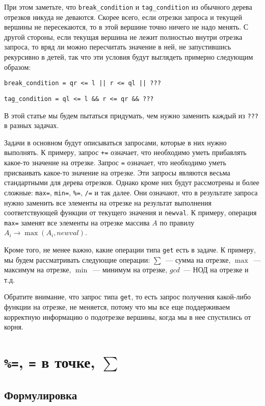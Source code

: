 При этом заметьте, что \verb+break_condition+ и \verb+tag_condition+ из обычного дерева отрезков никуда не деваются. Скорее всего, если отрезки запроса и текущей вершины не пересекаются, то в этой вершине точно ничего не надо менять. С другой стороны, если текущая вершина не лежит полностью внутри отрезка запроса, то вряд ли можно пересчитать значение в ней, не запустившись рекурсивно в детей, так что эти условия будут выглядеть примерно следующим образом:

\verb+break_condition = qr <= l || r <= ql || ???+

\verb+tag_condition = ql <= l && r <= qr && ???+

В этой статье мы будем пытаться придумать, чем нужно заменить каждый из \verb+???+ в разных задачах.

Задачи в основном будут описываться запросами, которые в них нужно выполнять. К примеру, запрос \verb^+=^ означает, что необходимо уметь прибавлять какое-то значение на отрезке. Запрос \verb+=+ означает, что необходимо уметь присваивать какое-то значение на отрезке. Эти запросы являются весьма стандартными для дерева отрезков. Однако кроме них будут рассмотрены и более сложные: \verb+max=+, \verb+min=+, \verb+%=+, \verb+/=+ и так далее. Они означают, что в результате запроса нужно заменить все элементы на отрезке на результат выполнения соответствующей функции от текущего значения и \verb+newval+. К примеру, операция \verb+max=+ заменят все элементы на отрезке массива $A$ по правилу $A_i \to \max(A_i, newval)$.

Кроме того, не менее важно, какие операции типа \verb+get+ есть в задаче. К примеру, мы будем рассматривать следующие операции: $\sum$~--- сумма на отрезке, $\max$~--- максимум на отрезке, $\min$~--- минимум на отрезке, $gcd$~--- НОД на отрезке и т.д.

\begin{observation}    
Обратите внимание, что запрос типа \verb+get+, то есть запрос получения какой-либо функции на отрезке, не меняется, потому что мы все еще поддерживаем корректную информацию о подотрезке вершины, когда мы в нее спустились от корня.
\end{observation}

\cprotect \section{\verb+%=+, \verb+=+ в точке, $\sum$}\label{perceqpoint}

\subsection{Формулировка}

